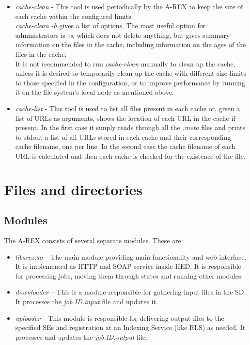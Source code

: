 \documentclass{article}                            %
\begin{document}
\begin{itemize}
\item \emph{cache-clean} - This tool is used periodically by the A-REX to
  keep the size of each cache within the configured
  limits.\\
  \emph{cache-clean -h} gives a list of options. The most
  useful option for administrators is \emph{-s}, which does not delete
  anything, but gives summary information on the files in the cache,
  including information on the ages of the files in the cache.\\
  It is not recommended to run \emph{cache-clean} manually to clean up
  the cache, unless it is desired to temporarily clean up the cache with
  different size limits to those specified in the configuration, or to
  improve performance by running it on the file system's local node as
  mentioned above.
\item \emph{cache-list} - This tool is used to list all files present
  in each cache or, given a list of URLs as arguments, shows the
  location of each URL in the cache if present. In the first case it
  simply reads through all the \emph{.meta }files and prints to stdout
  a list of all URLs stored in each cache and their corresponding
  cache filename, one per line. In the second case the cache filename
  of each URL is calculated and then each cache is checked for the
  existence of the file.
\end{itemize}


\section{Files and directories\label{sec:files and directories}}

\subsection{Modules}

The A-REX consists of several separate modules. These are:

\begin{itemize}
\item \textit{libarex.so} -- The main module providing main functionality
and web interface. It is implemented as HTTP and SOAP service inside
HED. It is responsible for processing jobs, moving them through states
and running other modules.
\item \textit{downloader} -- This is a module responsible for gathering input
files in the SD. It processes the \textit{job.ID.input} file and updates
it.
\item \textit{uploader} -- This module is responsible for delivering output
files to the specified SEs and registration at an Indexing Service
(like RLS) as needed. It processes and updates the \textit{job.ID.output}
file.
\end{itemize}
\end{document}
